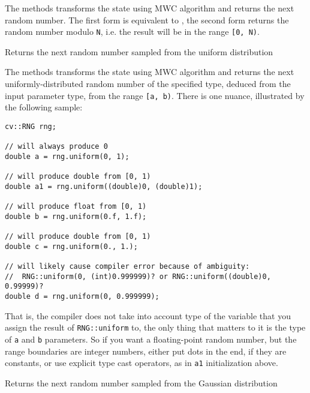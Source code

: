 The methods transforms the state using MWC algorithm and returns the next random number. The first form is equivalent to , the second form returns the random number modulo \texttt{N}, i.e. the result will be in the range \texttt{[0, N)}.

Returns the next random number sampled from the uniform distribution

\begin{description}
\end{description}

The methods transforms the state using MWC algorithm and returns the next uniformly-distributed random number of the specified type, deduced from the input parameter type, from the range \texttt{[a, b)}. There is one nuance, illustrated by the following sample:

\begin{lstlisting}
cv::RNG rng;

// will always produce 0
double a = rng.uniform(0, 1);

// will produce double from [0, 1)
double a1 = rng.uniform((double)0, (double)1);

// will produce float from [0, 1)
double b = rng.uniform(0.f, 1.f);

// will produce double from [0, 1)
double c = rng.uniform(0., 1.);

// will likely cause compiler error because of ambiguity:
//  RNG::uniform(0, (int)0.999999)? or RNG::uniform((double)0, 0.99999)?
double d = rng.uniform(0, 0.999999);
\end{lstlisting}

That is, the compiler does not take into account type of the variable that you assign the result of \texttt{RNG::uniform} to, the only thing that matters to it is the type of \texttt{a} and \texttt{b} parameters. So if you want a floating-point random number, but the range boundaries are integer numbers, either put dots in the end, if they are constants, or use explicit type cast operators, as in \texttt{a1} initialization above.


Returns the next random number sampled from the Gaussian distribution

